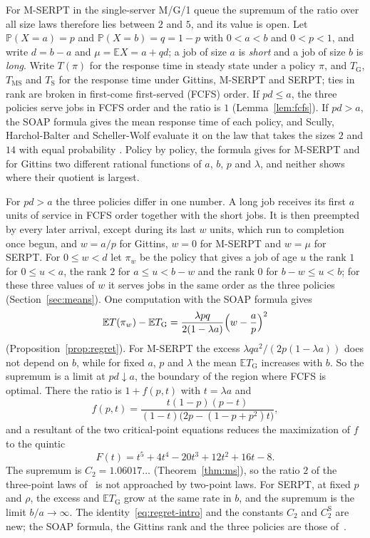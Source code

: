 \documentclass[11pt]{amsart}
\theoremstyle{remark}
\numberwithin{equation}{section}
\newcommand{\PP}{\mathbb{P}}
\newcommand{\E}{\mathbb{E}}
\begin{document}
For M-SERPT in the single-server M/G/1 queue the supremum of the ratio over
all size laws therefore lies between $2$ and $5$, and its value is open.
Let $\PP(X=a)=p$ and $\PP(X=b)=q=1-p$ with $0<a<b$ and $0<p<1$, and write $d=b-a$ and
$\mu=\E X=a+qd$; a job of size $a$ is \emph{short} and a job of size $b$ is
\emph{long}. Write $T(\pi)$ for the response time in steady state under a
policy $\pi$, and $T_{\mathrm G}$, $T_{\mathrm{MS}}$ and $T_{\mathrm S}$ for
the response time under Gittins, M-SERPT and SERPT; ties in rank are broken
in first-come first-served (FCFS) order. If $pd\le a$, the three policies
serve jobs in FCFS order and the ratio is $1$ (Lemma~\ref{lem:fcfs}). If
$pd>a$, the SOAP formula \cite[Theorem~5.5]{SHS18} gives the mean response
time of each policy, and Scully, Harchol-Balter and Scheller-Wolf evaluate it
on the law that takes the sizes $2$ and $14$ with equal probability
\cite[Section~6.4]{SHS18}. Policy by policy, the formula gives for M-SERPT and for Gittins two different rational
functions of $a$, $b$, $p$ and $\lambda$, and neither shows where their
quotient is largest.

For $pd>a$ the three policies differ in one number. A long job receives its first $a$
units of service in FCFS order together with the short jobs. It is then
preempted by every later arrival, except during its last $w$ units, which
run to completion once begun, and $w=a/p$ for Gittins, $w=0$ for M-SERPT and
$w=\mu$ for SERPT. For $0\le w<d$ let $\pi_w$ be the policy that gives a job
of age $u$ the rank $1$ for $0\le u<a$, the rank $2$ for $a\le u<b-w$ and the
rank $0$ for $b-w\le u<b$; for these three values of $w$ it serves jobs in
the same order as the three policies (Section~\ref{sec:means}). One
computation with the SOAP formula gives
\begin{equation}\label{eq:regret-intro}
\E T(\pi_w)-\E T_{\mathrm G}=\frac{\lambda pq}{2(1-\lambda a)}
\Bigl(w-\frac ap\Bigr)^2
\end{equation}
(Proposition~\ref{prop:regret}). For M-SERPT the excess
$\lambda qa^2/(2p(1-\lambda a))$ does not depend on $b$, while for fixed $a$,
$p$ and $\lambda$ the mean $\E T_{\mathrm G}$ increases with $b$. So the
supremum is a limit at $pd\downarrow a$, the boundary of the region where
FCFS is optimal. There the ratio is $1+f(p,t)$ with $t=\lambda a$ and
\begin{equation}\label{eq:f}
f(p,t)=\frac{t(1-p)(p-t)}{(1-t)\bigl(2p-(1-p+p^2)t\bigr)},
\end{equation}
and a resultant of the two critical-point equations reduces the
maximization of $f$ to the quintic
\begin{equation}\label{eq:F}
F(t)=t^5+4t^4-20t^3+12t^2+16t-8 .
\end{equation}
The supremum is $C_2=1.06017\ldots$ (Theorem~\ref{thm:ms}), so the ratio $2$
of the three-point laws of~\cite[Section~7]{SHS20} is not approached by
two-point laws.
For SERPT, at fixed $p$ and $\rho$, the excess and
$\E T_{\mathrm G}$ grow at the same rate in $b$, and the supremum is the
limit $b/a\to\infty$. The identity~\eqref{eq:regret-intro} and the
constants $C_2$ and $C_2^{\mathrm S}$ are new; the SOAP formula, the
Gittins rank and the three policies are those of~\cite{SHS18,SHS20}.
\end{document}
